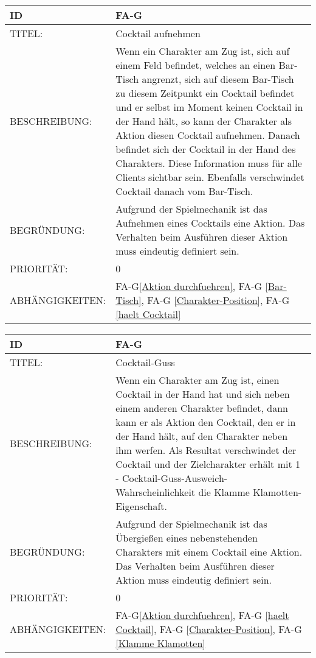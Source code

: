 \begin{tabularx}{16cm}{l|X}
	{table}\label{Cocktail aufnehmen}
	\textbf{ID} & \textbf{FA-G\arabic{table}} \\
	\hline
	TITEL: & Cocktail aufnehmen \\
	\hline
	BESCHREIBUNG: & Wenn ein Charakter am Zug ist, sich auf einem Feld befindet, welches an einen Bar-Tisch angrenzt, sich auf diesem Bar-Tisch zu diesem Zeitpunkt ein Cocktail befindet und er selbst im Moment keinen Cocktail in der Hand hält, so kann der Charakter als Aktion diesen Cocktail aufnehmen. Danach befindet sich der Cocktail in der Hand des Charakters. Diese Information muss für alle Clients sichtbar sein. Ebenfalls verschwindet Cocktail danach vom Bar-Tisch.\\
	 
	\hline
	BEGRÜNDUNG: & Aufgrund der Spielmechanik ist das Aufnehmen eines Cocktails eine Aktion. Das Verhalten beim Ausführen dieser Aktion muss eindeutig definiert sein.\\
	\hline
	PRIORITÄT: & 0\\
	\hline
	ABHÄNGIGKEITEN: & FA-G\ref{Aktion durchfuehren}, FA-G \ref{Bar-Tisch}, FA-G \ref{Charakter-Position},  FA-G \ref{haelt Cocktail} \\
\end{tabularx}

\begin{tabularx}{16cm}{l|X}
	{table}\label{Cocktail-Guss}
	\textbf{ID} & \textbf{FA-G\arabic{table}} \\
	\hline
	TITEL: & Cocktail-Guss \\
	\hline
	BESCHREIBUNG: & Wenn ein Charakter am Zug ist, einen Cocktail in der Hand hat und sich neben einem anderen Charakter befindet, dann kann er als Aktion den Cocktail, den er in der Hand hält, auf den Charakter neben ihm werfen. Als Resultat verschwindet der Cocktail und der Zielcharakter erhält mit 1 - Cocktail-Guss-Ausweich-Wahrscheinlichkeit die Klamme Klamotten-Eigenschaft. \\
	 
	\hline
	BEGRÜNDUNG: & Aufgrund der Spielmechanik ist das Übergießen eines nebenstehenden Charakters mit einem Cocktail eine Aktion. Das Verhalten beim Ausführen dieser Aktion muss eindeutig definiert sein.\\
	\hline
	PRIORITÄT: & 0\\
	\hline
	ABHÄNGIGKEITEN: & FA-G\ref{Aktion durchfuehren}, FA-G \ref{haelt Cocktail}, FA-G \ref{Charakter-Position}, FA-G \ref{Klamme Klamotten}  \\
\end{tabularx}

